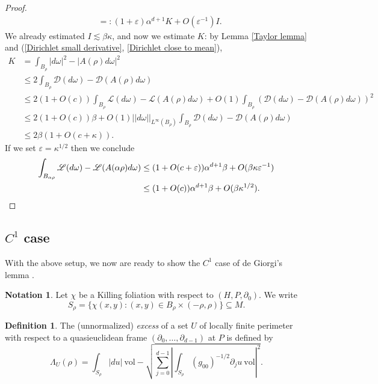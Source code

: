 \documentclass[reqno,12pt,letterpaper]{amsart}
\newcommand{\Lagrange}{\mathscr L}
\newcommand{\DirL}{\mathscr D}
\newcommand{\vol}{\mathrm{vol}}
\newcommand{\dfn}[1]{\emph{#1}\index{#1}}
\theoremstyle{definition}
\newtheorem{definition}[theorem]{Definition}
\newtheorem{notation}[theorem]{Notation}
\numberwithin{equation}{section}
\begin{document}
\begin{proof}
\begin{align*}
&=: (1 + \varepsilon)\alpha^{d + 1}K + O(\varepsilon^{-1})I.
\end{align*}
We already estimated $I \lesssim \beta \kappa$, and now we estimate $K$: by Lemma \ref{Taylor lemma} and (\ref{Dirichlet small derivative}, \ref{Dirichlet close to mean}),
\begin{align*}
K &= \int_{B_\rho} |d\omega|^2 - |A(\rho)d\omega|^2\\
&\leq 2\int_{B_\rho} \DirL(d\omega) - \DirL(A(\rho)d\omega)\\
&\leq 2(1 + O(c))\int_{B_\rho} \Lagrange(d\omega) - \Lagrange(A(\rho)d\omega) + O(1) \int_{B_\rho} (\DirL(d\omega) - \DirL(A(\rho)d\omega))^2\\
&\leq 2(1 + O(c))\beta + O(1) ||d\omega||_{L^\infty(B_\rho)} \int_{B_\rho} \DirL(d\omega) - \DirL(A(\rho)d\omega) \\
&\leq 2\beta(1 + O(c + \kappa)).
\end{align*}
If we set $\varepsilon = \kappa^{1/2}$ then we conclude
\begin{align*}
\int_{B_{\alpha\rho}} \Lagrange(d\omega) - \Lagrange(A(\alpha\rho)d\omega)
&\leq (1 + O(c + \varepsilon)) \alpha^{d + 1}\beta + O(\beta \kappa \varepsilon^{-1})\\
&\leq (1 + O(c))\alpha^{d + 1} \beta + O(\beta \kappa^{1/2}). \qedhere
\end{align*}
\end{proof}

\subsection{$C^1$ case}
With the above setup, we now are ready to show the $C^1$ case of de Giorgi's lemma \cite[Teorema 4.4]{Miranda66}.

\begin{notation}
Let $\chi$ be a Killing foliation with respect to $(H, P, \partial_0)$.
We write
$$S_\rho = \{\chi(x, y): (x, y) \in B_\rho \times (-\rho, \rho)\} \subseteq M.$$
\end{notation}

\begin{definition}
The (unnormalized) \dfn{excess} of a set $U$ of locally finite perimeter with respect to a quasieuclidean frame $(\partial_0, \dots, \partial_{d - 1})$ at $P$ is defined by
$$\Lambda_U(\rho) = \int_{S_\rho} |du| ~\vol - \sqrt{\sum_{j=0}^{d - 1} \left|\int_{S_\rho} (g_{00})^{-1/2} \partial_ju ~\vol\right|^2}.$$
\end{definition}
\end{document}
